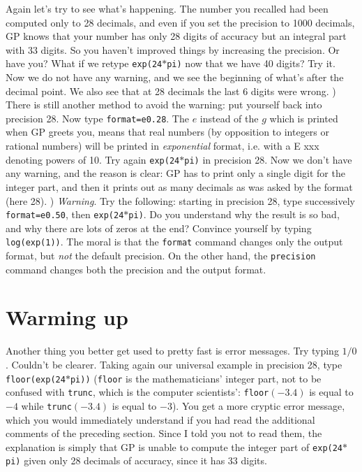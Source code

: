 Again let's try to see what's happening. The number you recalled had been computed only
to 28 decimals, and even if you set the precision to 1000 decimals, GP knows that
your number has only 28 digits of accuracy but an integral part with 33 digits. So
you haven't improved things by increasing the precision. Or have you? What if we
retype {\tt exp(24$*$pi)} now that we have 40 digits? Try it. Now we do not have
any warning, and we see the beginning of what's after the decimal point. We also
see that at 28 decimals the last 6 digits were wrong.
) There is still another method to avoid the warning: put yourself back into
precision 28. Now type {\tt \bs format=e0.28}. The $e$ instead of the $g$
which is printed when GP greets you, means that real numbers (by opposition to
integers or rational numbers) will be printed in {\sl exponential\/} format, i.e.
with a E xxx denoting powers of 10. Try again {\tt exp(24$*$pi)} in precision 28.
Now we don't have any warning, and the reason is clear: GP has to print only a
single digit for the integer part, and then it prints out as many decimals as
was asked by the format (here 28).
) {\sl Warning\/}. Try the following: starting in precision 28, type 
successively {\tt \bs format=e0.50}, then {\tt exp(24$*$pi)}. Do you
understand why the result is so bad, and why there are lots of zeros at the end?
Convince yourself by typing {\tt log(exp(1))}. The moral is that the {\tt format}
command changes only the output format, but {\sl not\/} the default precision.
On the other hand, the {\tt precision} command changes both the precision and
the output format.
\medskip
\section{Warming up}
\medskip
Another thing you better get used to pretty fast is error messages. Try typing
$1/0$. Couldn't be clearer. Taking again our universal example in precision 28,
type {\tt floor(exp(24$*$pi))} ({\tt floor} is the mathematicians' integer part, not
to be confused with {\tt trunc}, which is the computer scientists': 
{\tt floor$(-3.4)$} is equal to $-4$ while {\tt trunc$(-3.4)$} is equal to $-3$).
You get a more cryptic error message, which you would immediately understand if you
had read the additional comments of the preceding section. Since I told you not
to read them, the explanation is simply that GP is unable to compute the integer
part of {\tt exp(24$*$pi)} given only 28 decimals of accuracy, since it has 33 digits.

